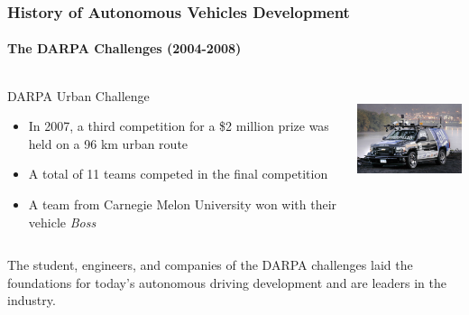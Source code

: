 \begin{frame}
\frametitle{History of Autonomous Vehicles Development}
\framesubtitle{The DARPA Challenges (2004-2008)}
\begin{columns}[T]
    \begin{column}{.6\textwidth}
    DARPA Urban Challenge\footnotemark[1]
    \begin{itemize}
        \item In 2007, a third competition for a \$2 million prize was held on
            a 96 km urban route
        \item A total of 11 teams competed in the final competition
        \item A team from Carnegie Melon University won with their vehicle
            \emph{Boss}
    \end{itemize}
    \end{column}
    \begin{column}{.4\textwidth}
    \centering
    \includegraphics[height=3cm]{images/darpa_boss.jpg} \\
    \tiny{\cite{CMUUrbanChallenge}}
    \end{column}
\end{columns}
\pause
\vspace{0.25cm}
\begin{block}{}
The student, engineers, and companies of the DARPA challenges laid the
foundations for today's autonomous driving development and are leaders in the
industry.
\end{block}
\end{frame}

